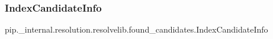 \subsubsection{\texorpdfstring{Index\+Candidate\+Info}{IndexCandidateInfo}}
{\footnotesize\ttfamily pip.\+\_\+internal.\+resolution.\+resolvelib.\+found\+\_\+candidates.\+Index\+Candidate\+Info}


